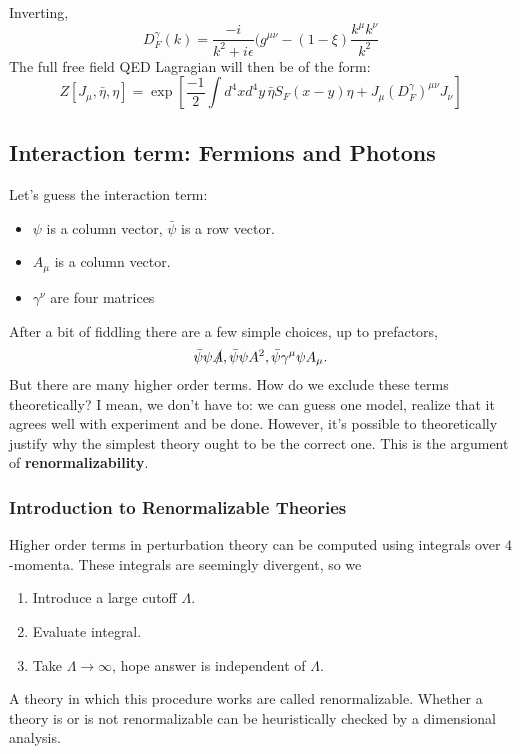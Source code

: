 \documentclass{report}
\theoremstyle{plain}
\theoremstyle{definition}
\theoremstyle{remark}
\newcommand{\FR}[2]{\frac{#1}{#2}}
\newcommand{\gam}{\gamma}
\begin{document}
Inverting,
\[D^\gam_F(k)=\FR{-i}{k^2+i\epsilon}(g^{\mu\nu}-(1-\xi)\FR{k^\mu k^\nu}{k^2}\]
The full free field QED Lagragian will then be of the form:
\[ Z[J_\mu,\bar\eta,\eta] = \exp\left[ \FR{-1}{2}\int d^4x d^4y\, \bar\eta
S_F(x-y) \eta + J_\mu (D^\gam_F)^{\mu\nu} J_\nu \right] \]
\subsection{Interaction term: Fermions and Photons}
Let's guess the interaction term:
\begin{itemize}
    \item $\psi$ is a column vector, $\bar\psi$ is a row vector.
    \item $A_\mu$ is a column vector.
    \item $\gam^\nu$ are four matrices
\end{itemize}
After a bit of fiddling there are a few simple choices, up to prefactors,
\[\bar\psi\psi\slashed A, \bar\psi\psi A^2, \bar\psi\gam^\mu\psi A_\mu.\]
But there are many higher order terms. How do we exclude these terms
theoretically? I mean, we don't have to: we can guess one model, realize
that it agrees well with experiment and be done. However, it's possible to
theoretically justify why the simplest theory ought to be the correct one.
This is the argument of \textbf{renormalizability}.

\subsubsection{Introduction to Renormalizable Theories}
Higher order terms in perturbation theory can be computed using integrals
over $4$-momenta. These integrals are seemingly divergent, so we 
\begin{enumerate}
    \item Introduce a large cutoff $\Lambda$.
    \item Evaluate integral.
    \item Take $\Lambda\to\infty$, hope answer is independent of $\Lambda$.
\end{enumerate}
A theory in which this procedure works are called renormalizable. Whether a
theory is or is not renormalizable can be heuristically checked by a
dimensional analysis.
\end{document}
